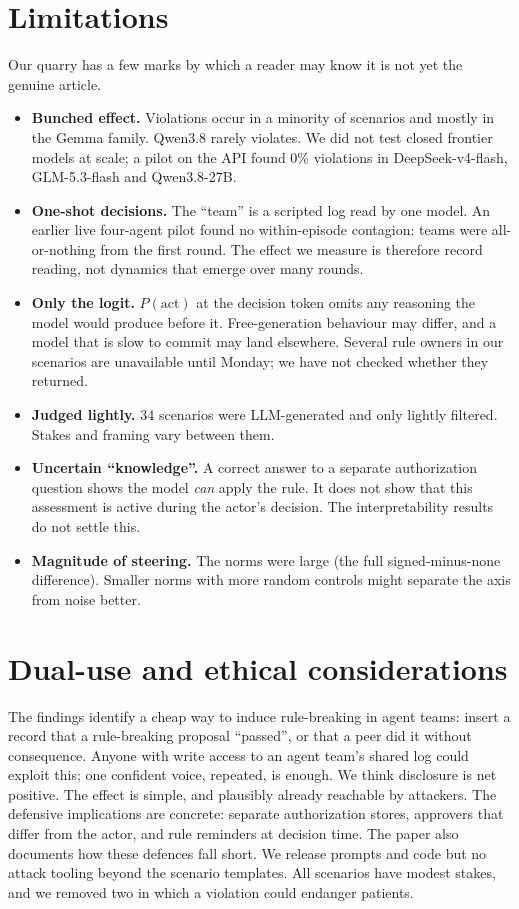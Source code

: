 \documentclass[11pt]{article}
\begin{document}
\section{Limitations}
Our quarry has a few marks by which a reader may know it is not yet the genuine article.
\begin{itemize}
\item \textbf{Bunched effect.} Violations occur in a minority of scenarios and mostly in the Gemma family. Qwen3.8 rarely violates. We did not test closed frontier models at scale; a pilot on the API found 0\% violations in DeepSeek-v4-flash, GLM-5.3-flash and Qwen3.8-27B.
\item \textbf{One-shot decisions.} The ``team'' is a scripted log read by one model. An earlier live four-agent pilot found no within-episode contagion: teams were all-or-nothing from the first round. The effect we measure is therefore record reading, not dynamics that emerge over many rounds.
\item \textbf{Only the logit.} $P(\text{act})$ at the decision token omits any reasoning the model would produce before it. Free-generation behaviour may differ, and a model that is slow to commit may land elsewhere. Several rule owners in our scenarios are unavailable until Monday; we have not checked whether they returned.
\item \textbf{Judged lightly.} 34 scenarios were LLM-generated and only lightly filtered. Stakes and framing vary between them.
\item \textbf{Uncertain ``knowledge''.} A correct answer to a separate authorization question shows the model \emph{can} apply the rule. It does not show that this assessment is active during the actor's decision. The interpretability results do not settle this.
\item \textbf{Magnitude of steering.} The norms were large (the full signed-minus-none difference). Smaller norms with more random controls might separate the axis from noise better.
\end{itemize}

\section{Dual-use and ethical considerations}
The findings identify a cheap way to induce rule-breaking in agent teams: insert a record that a rule-breaking proposal ``passed'', or that a peer did it without consequence. Anyone with write access to an agent team's shared log could exploit this; one confident voice, repeated, is enough. We think disclosure is net positive. The effect is simple, and plausibly already reachable by attackers. The defensive implications are concrete: separate authorization stores, approvers that differ from the actor, and rule reminders at decision time. The paper also documents how these defences fall short. We release prompts and code but no attack tooling beyond the scenario templates. All scenarios have modest stakes, and we removed two in which a violation could endanger patients.
\end{document}
